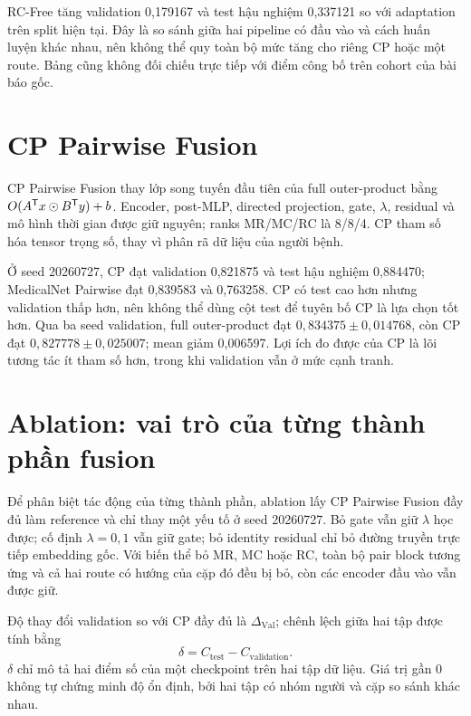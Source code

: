 RC-Free tăng validation 0,179167 và test hậu nghiệm 0,337121 so với adaptation trên split hiện tại. Đây là so sánh giữa hai pipeline có đầu vào và cách huấn luyện khác nhau, nên không thể quy toàn bộ mức tăng cho riêng CP hoặc một route. Bảng cũng không đối chiếu trực tiếp với điểm công bố trên cohort của bài báo gốc.

\section{CP Pairwise Fusion}
\label{sec:cp-results}
CP Pairwise Fusion thay lớp song tuyến đầu tiên của full outer-product bằng $O(A^{\mathsf{T}}x\odot B^{\mathsf{T}}y)+b$. Encoder, post-MLP, directed projection, gate, $\lambda$, residual và mô hình thời gian được giữ nguyên; ranks MR/MC/RC là 8/8/4. CP tham số hóa tensor trọng số, thay vì phân rã dữ liệu của người bệnh.

Ở seed 20260727, CP đạt validation 0,821875 và test hậu nghiệm 0,884470; MedicalNet Pairwise đạt 0,839583 và 0,763258. CP có test cao hơn nhưng validation thấp hơn, nên không thể dùng cột test để tuyên bố CP là lựa chọn tốt hơn. Qua ba seed validation, full outer-product đạt $0{,}834375\pm0{,}014768$, còn CP đạt $0{,}827778\pm0{,}025007$; mean giảm 0,006597. Lợi ích đo được của CP là lõi tương tác ít tham số hơn, trong khi validation vẫn ở mức cạnh tranh.

\section{Ablation: vai trò của từng thành phần fusion}
\label{sec:ablation-results}
Để phân biệt tác động của từng thành phần, ablation lấy CP Pairwise Fusion đầy đủ làm reference và chỉ thay một yếu tố ở seed 20260727. Bỏ gate vẫn giữ $\lambda$ học được; cố định $\lambda=0{,}1$ vẫn giữ gate; bỏ identity residual chỉ bỏ đường truyền trực tiếp embedding gốc. Với biến thể bỏ MR, MC hoặc RC, toàn bộ pair block tương ứng và cả hai route có hướng của cặp đó đều bị bỏ, còn các encoder đầu vào vẫn được giữ.

Độ thay đổi validation so với CP đầy đủ là $\Delta_{\mathrm{Val}}$; chênh lệch giữa hai tập được tính bằng
\begin{equation}
\delta=C_{\mathrm{test}}-C_{\mathrm{validation}}.
\label{eq:split-gap}
\end{equation}
$\delta$ chỉ mô tả hai điểm số của một checkpoint trên hai tập dữ liệu. Giá trị gần 0 không tự chứng minh độ ổn định, bởi hai tập có nhóm người và cặp so sánh khác nhau.

